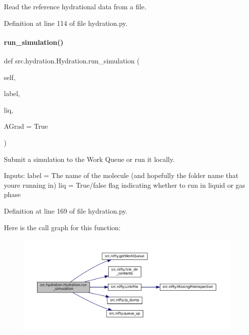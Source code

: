 Read the reference hydrational data from a file. 



Definition at line 114 of file hydration.\+py.

\mbox{\label{classsrc_1_1hydration_1_1Hydration_a6125922f50fa7e55aece75245d4b3cfb}} 
\paragraph{\texorpdfstring{run\+\_\+simulation()}{run\_simulation()}}
{\footnotesize\ttfamily def src.\+hydration.\+Hydration.\+run\+\_\+simulation (\begin{DoxyParamCaption}\item[{}]{self,  }\item[{}]{label,  }\item[{}]{liq,  }\item[{}]{A\+Grad = {\ttfamily True} }\end{DoxyParamCaption})}



Submit a simulation to the Work Queue or run it locally. 

Inputs\+: label = The name of the molecule (and hopefully the folder name that you\textquotesingle{}re running in) liq = True/false flag indicating whether to run in liquid or gas phase 

Definition at line 169 of file hydration.\+py.

Here is the call graph for this function\+:
\nopagebreak
\begin{figure}[H]
\begin{center}
\leavevmode
\includegraphics[width=350pt]{classsrc_1_1hydration_1_1Hydration_a6125922f50fa7e55aece75245d4b3cfb_cgraph}
\end{center}
\end{figure}
\mbox{\label{classsrc_1_1hydration_1_1Hydration_a09b7d661320caa13bf94b198e4293156}} 
